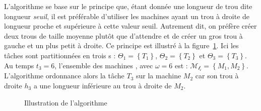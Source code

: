 \documentclass[a4paper,9pt]{article}
\begin{document}
L'algorithme se base sur le principe que, étant donnée une longueur de trou dite longueur
\emph{seuil}, il est préférable d'utiliser les machines ayant un trou à droite de longueur proche et
supérieure à cette valeur seuil. Autrement dit, on préfère créer deux trous de taille moyenne plutôt
que d'attendre et de créer un gros trou à gauche et un plus petit à droite. Ce principe est
illustré à la figure~\ref{fig:principeordo}. Ici les tâches sont partitionnées en trois
\tphase{}s : $\Theta_1 = \left\{ T_1 \right\}$, $\Theta_2 = \left\{ T_2 \right\}$ et $\Theta_3 =
\left\{ T_3 \right\}$. Au temps $t_3 = 6$, l'ensemble des machines
, avec $\omega = 6$ est :  $\mathcal{M_{t_i}} = \left\{ M_1, M_2
\right\}$. L'algorithme ordonnance alors la tâche $T_3$ sur la machine $M_2$ car son trou à droite
$h_3$ a une longueur inférieure au trou à droite de $M_2$.

\begin{figure}
    \centering
    \begin{minipage}[t]{6.5cm}
        \begin{ordo}[5.2]{2}{2}{12}



        \end{ordo}
        \label{fig:ordo_phase}
    \end{minipage}
    \hfill
    \begin{minipage}[t]{6.5cm}
        \begin{ordo}[5.2]{2}{2}{12}



        \end{ordo}
        \label{fig:ordo_choix}
    \end{minipage}
    \caption{Illustration de l'algorithme}
    \label{fig:principeordo}
\end{figure}
\end{document}
